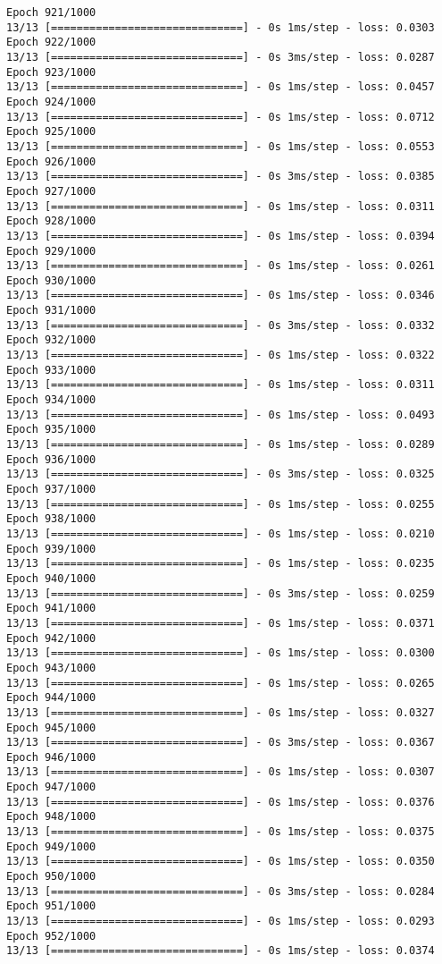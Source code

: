 \documentclass[11pt]{article}
\begin{document}
\begin{Verbatim}[commandchars=\\\{\}]
Epoch 921/1000
13/13 [==============================] - 0s 1ms/step - loss: 0.0303
Epoch 922/1000
13/13 [==============================] - 0s 3ms/step - loss: 0.0287
Epoch 923/1000
13/13 [==============================] - 0s 1ms/step - loss: 0.0457
Epoch 924/1000
13/13 [==============================] - 0s 1ms/step - loss: 0.0712
Epoch 925/1000
13/13 [==============================] - 0s 1ms/step - loss: 0.0553
Epoch 926/1000
13/13 [==============================] - 0s 3ms/step - loss: 0.0385
Epoch 927/1000
13/13 [==============================] - 0s 1ms/step - loss: 0.0311
Epoch 928/1000
13/13 [==============================] - 0s 1ms/step - loss: 0.0394
Epoch 929/1000
13/13 [==============================] - 0s 1ms/step - loss: 0.0261
Epoch 930/1000
13/13 [==============================] - 0s 1ms/step - loss: 0.0346
Epoch 931/1000
13/13 [==============================] - 0s 3ms/step - loss: 0.0332
Epoch 932/1000
13/13 [==============================] - 0s 1ms/step - loss: 0.0322
Epoch 933/1000
13/13 [==============================] - 0s 1ms/step - loss: 0.0311
Epoch 934/1000
13/13 [==============================] - 0s 1ms/step - loss: 0.0493
Epoch 935/1000
13/13 [==============================] - 0s 1ms/step - loss: 0.0289
Epoch 936/1000
13/13 [==============================] - 0s 3ms/step - loss: 0.0325
Epoch 937/1000
13/13 [==============================] - 0s 1ms/step - loss: 0.0255
Epoch 938/1000
13/13 [==============================] - 0s 1ms/step - loss: 0.0210
Epoch 939/1000
13/13 [==============================] - 0s 1ms/step - loss: 0.0235
Epoch 940/1000
13/13 [==============================] - 0s 3ms/step - loss: 0.0259
Epoch 941/1000
13/13 [==============================] - 0s 1ms/step - loss: 0.0371
Epoch 942/1000
13/13 [==============================] - 0s 1ms/step - loss: 0.0300
Epoch 943/1000
13/13 [==============================] - 0s 1ms/step - loss: 0.0265
Epoch 944/1000
13/13 [==============================] - 0s 1ms/step - loss: 0.0327
Epoch 945/1000
13/13 [==============================] - 0s 3ms/step - loss: 0.0367
Epoch 946/1000
13/13 [==============================] - 0s 1ms/step - loss: 0.0307
Epoch 947/1000
13/13 [==============================] - 0s 1ms/step - loss: 0.0376
Epoch 948/1000
13/13 [==============================] - 0s 1ms/step - loss: 0.0375
Epoch 949/1000
13/13 [==============================] - 0s 1ms/step - loss: 0.0350
Epoch 950/1000
13/13 [==============================] - 0s 3ms/step - loss: 0.0284
Epoch 951/1000
13/13 [==============================] - 0s 1ms/step - loss: 0.0293
Epoch 952/1000
13/13 [==============================] - 0s 1ms/step - loss: 0.0374

\end{Verbatim}
\end{document}
